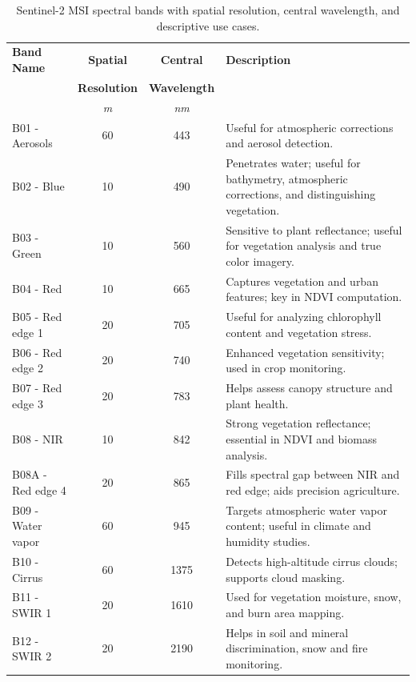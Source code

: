 \documentclass[a4paper, oneside, english]{sapthesis}
\begin{document}
\begin{table}[ht]
\centering
\scriptsize
\begin{tabular}{lccp{6cm}}  %
\toprule
\textbf{Band Name} & \textbf{Spatial} & \textbf{Central} & \textbf{Description} \\
{} & \textbf{Resolution} & \textbf{Wavelength} & \\
{} & \emph{m} & \emph{nm} & \\
\midrule
B01 - Aerosols  & 60 & 443  & Useful for atmospheric corrections and aerosol detection. \\
B02 - Blue & 10 & 490  & Penetrates water; useful for bathymetry, atmospheric corrections, and distinguishing vegetation. \\
B03 - Green & 10 & 560  & Sensitive to plant reflectance; useful for vegetation analysis and true color imagery. \\
B04 - Red & 10 & 665  & Captures vegetation and urban features; key in NDVI computation. \\
B05 - Red edge 1 & 20 & 705  & Useful for analyzing chlorophyll content and vegetation stress. \\
B06 - Red edge 2 & 20 & 740  & Enhanced vegetation sensitivity; used in crop monitoring. \\
B07 - Red edge 3 & 20 & 783  & Helps assess canopy structure and plant health. \\
B08 - NIR & 10 & 842  & Strong vegetation reflectance; essential in NDVI and biomass analysis. \\
B08A - Red edge 4 & 20 & 865  & Fills spectral gap between NIR and red edge; aids precision agriculture. \\
B09 - Water vapor & 60 & 945  & Targets atmospheric water vapor content; useful in climate and humidity studies. \\
B10 - Cirrus & 60 & 1375 & Detects high-altitude cirrus clouds; supports cloud masking. \\
B11 - SWIR 1 & 20 & 1610 & Used for vegetation moisture, snow, and burn area mapping. \\
B12 - SWIR 2 & 20 & 2190 & Helps in soil and mineral discrimination, snow and fire monitoring. \\
\bottomrule
\end{tabular}
\vspace{0.3cm}
\caption{Sentinel-2 MSI spectral bands with spatial resolution, central wavelength, and descriptive use cases.}
\label{tab:sentinel2_bands}
\end{table}
\end{document}

